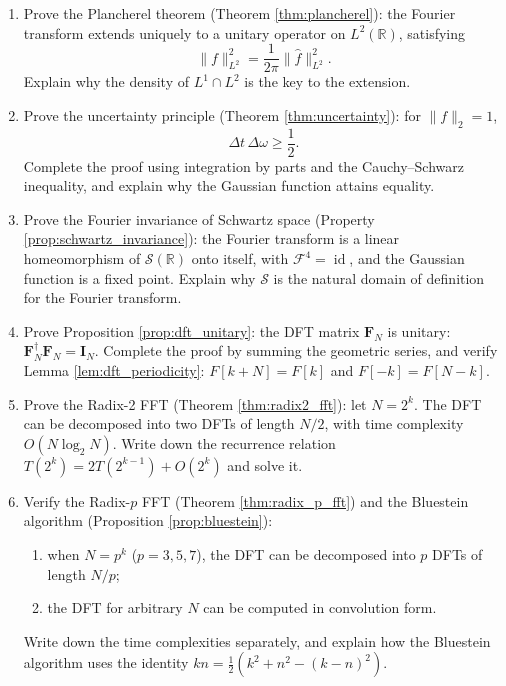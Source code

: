 \begin{enumerate}[leftmargin=3em, label=\textbf{Exercise \arabic*}]
    \item Prove the Plancherel theorem (Theorem \ref{thm:plancherel}):
    the Fourier transform extends uniquely to a unitary operator on $L^2(\mathbb{R})$, satisfying
    \[
    \|f\|_{L^2}^2=\frac{1}{2\pi}\|\hat f\|_{L^2}^2.
    \]
    Explain why the density of $L^1\cap L^2$ is the key to the extension.

    \item Prove the uncertainty principle (Theorem \ref{thm:uncertainty}):
    for $\|f\|_2=1$,
    \[
    \Delta t\,\Delta\omega\ge\frac12.
    \]
    Complete the proof using integration by parts and the Cauchy--Schwarz inequality,
    and explain why the Gaussian function attains equality.

    \item Prove the Fourier invariance of Schwartz space (Property \ref{prop:schwartz_invariance}):
    the Fourier transform is a linear homeomorphism of $\mathcal{S}(\mathbb{R})$ onto itself,
    with $\mathcal{F}^4=\operatorname{id}$, and the Gaussian function is a fixed point.
    Explain why $\mathcal{S}$ is the natural domain of definition for the Fourier transform.

    \item Prove Proposition \ref{prop:dft_unitary}:
    the DFT matrix $\mathbf{F}_N$ is unitary: $\mathbf{F}_N^\dagger\mathbf{F}_N=\mathbf{I}_N$.
    Complete the proof by summing the geometric series,
    and verify Lemma \ref{lem:dft_periodicity}:
    $F[k+N]=F[k]$ and $F[-k]=F[N-k]$.

    \item Prove the Radix-2 FFT (Theorem \ref{thm:radix2_fft}):
    let $N=2^k$. The DFT can be decomposed into two DFTs of length $N/2$,
    with time complexity $O(N\log_2N)$.
    Write down the recurrence relation $T(2^k)=2T(2^{k-1})+O(2^k)$ and solve it.

    \item Verify the Radix-$p$ FFT (Theorem \ref{thm:radix_p_fft}) and the Bluestein algorithm (Proposition \ref{prop:bluestein}):
    \begin{enumerate}[label=(\roman*)]
        \item when $N=p^k$ ($p=3,5,7$), the DFT can be decomposed into $p$ DFTs of length $N/p$;
        \item the DFT for arbitrary $N$ can be computed in convolution form.
    \end{enumerate}
    Write down the time complexities separately, and explain how the Bluestein algorithm uses the identity
    $kn=\frac12(k^2+n^2-(k-n)^2)$.


\end{enumerate}
